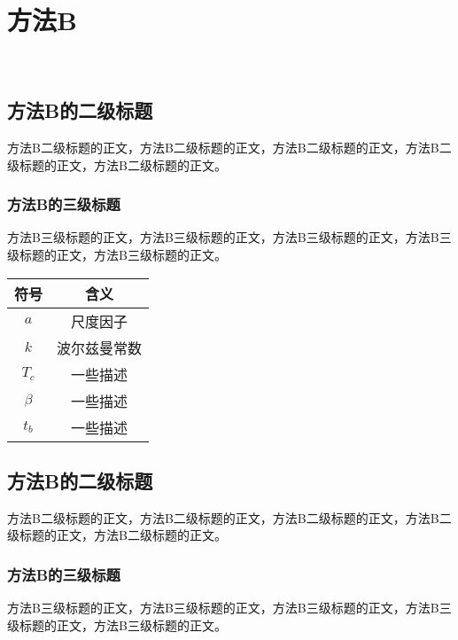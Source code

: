 \section{方法B\label{方法B}}

\begin{figure}[htb]
    \centering
    \\
    \captionsetup{font=footnotesize}
    \label{fig:幂律参数空间B}
\end{figure}

\subsection{方法B的二级标题}

方法B二级标题的正文，方法B二级标题的正文，方法B二级标题的正文，方法B二级标题的正文，方法B二级标题的正文。

\subsubsection{方法B的三级标题}

方法B三级标题的正文，方法B三级标题的正文，方法B三级标题的正文，方法B三级标题的正文，方法B三级标题的正文。


\begin{table}[htb]
    \centering
    \captionsetup{font=footnotesize}
    \label{tab:符号对照表B}
    \begin{tabular}{@{}cc@{}}
        \toprule
        符号     & 含义       \\ 
        \midrule
        $a$     & 尺度因子    \\
        $k$     & 波尔兹曼常数 \\
        $T_c$   & 一些描述    \\
        $\beta$ & 一些描述    \\
        $t_b$   & 一些描述    \\
        \bottomrule
    \end{tabular}
\end{table}

\subsection{方法B的二级标题}

方法B二级标题的正文，方法B二级标题的正文，方法B二级标题的正文，方法B二级标题的正文，方法B二级标题的正文。

\subsubsection{方法B的三级标题}

方法B三级标题的正文，方法B三级标题的正文，方法B三级标题的正文，方法B三级标题的正文，方法B三级标题的正文。